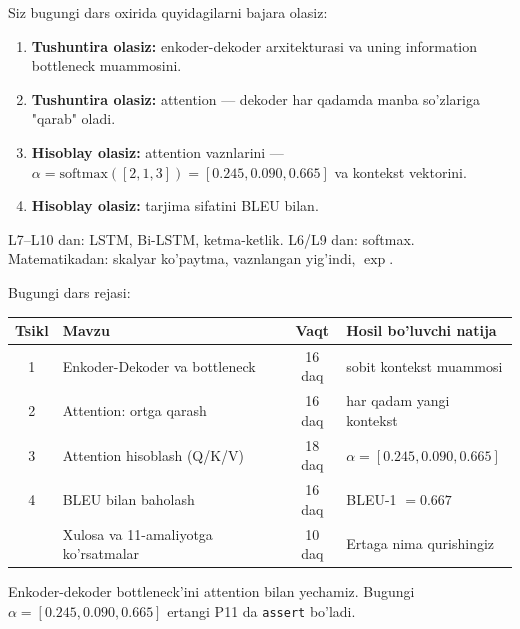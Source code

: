 \documentclass[aspectratio=169,11pt]{beamer}
\begin{document}
\begin{frame}{Siz bugungi dars oxirida quyidagilarni bajara olasiz:}
  \begin{enumerate}\setlength\itemsep{6pt}
    \item \textbf{Tushuntira olasiz:} enkoder-dekoder arxitekturasi va uning
          information bottleneck muammosini.
    \item \textbf{Tushuntira olasiz:} attention --- dekoder har qadamda manba
          so'zlariga "qarab" oladi.
    \item \textbf{Hisoblay olasiz:} attention vaznlarini ---
          $\alpha=\mathrm{softmax}([2,1,3])=[0.245,0.090,0.665]$ va kontekst vektorini.
    \item \textbf{Hisoblay olasiz:} tarjima sifatini BLEU bilan.
  \end{enumerate}
  \vspace{4pt}
  \begin{tcolorbox}[defbox,title=Oldindan talab]
    \footnotesize
    L7--L10 dan: LSTM, Bi-LSTM, ketma-ketlik. L6/L9 dan: softmax. Matematikadan:
    skalyar ko'paytma, vaznlangan yig'indi, $\exp$.
  \end{tcolorbox}
\end{frame}

\begin{frame}{Bugungi dars rejasi:}
  \begin{center}
  \small
  \begin{tabular}{c p{5.0cm} c p{3.0cm}}
    \toprule
    \textbf{Tsikl}& \textbf{Mavzu} & \textbf{Vaqt} & \textbf{Hosil bo'luvchi natija}\\
    \midrule
    1 & Enkoder-Dekoder va bottleneck & 16 daq & sobit kontekst muammosi \\
    2 & Attention: ortga qarash & 16 daq & har qadam yangi kontekst \\
    3 & Attention hisoblash (Q/K/V) & 18 daq & $\alpha=[0.245,0.090,0.665]$ \\
    4 & BLEU bilan baholash & 16 daq & BLEU-1 $=0.667$ \\
    \midrule
      & Xulosa va 11-amaliyotga ko'rsatmalar & 10 daq & Ertaga nima qurishingiz \\
    \bottomrule
  \end{tabular}
  \end{center}
  \vspace{4pt}
  \begin{tcolorbox}[warnbox,title=Bu dars attention'ga olib keladi]
    \footnotesize\sloppy
    Enkoder-dekoder bottleneck'ini attention bilan yechamiz. Bugungi
    $\alpha=[0.245,0.090,0.665]$ ertangi P11 da \texttt{assert} bo'ladi.
  \end{tcolorbox}
\end{frame}
\end{document}

